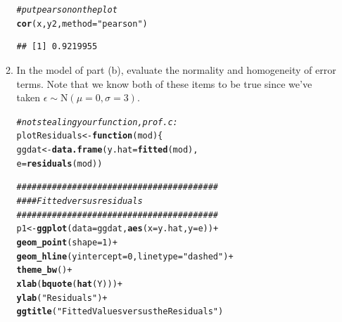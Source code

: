 \documentclass{article}\usepackage[]{graphicx}\usepackage[]{color}
\makeatletter
\newcommand{\hlnum}[1]{\textcolor[rgb]{0.686,0.059,0.569}{#1}}%
\newcommand{\hlstr}[1]{\textcolor[rgb]{0.192,0.494,0.8}{#1}}%
\newcommand{\hlcom}[1]{\textcolor[rgb]{0.678,0.584,0.686}{\textit{#1}}}%
\newcommand{\hlopt}[1]{\textcolor[rgb]{0,0,0}{#1}}%
\newcommand{\hlstd}[1]{\textcolor[rgb]{0.345,0.345,0.345}{#1}}%
\newcommand{\hlkwa}[1]{\textcolor[rgb]{0.161,0.373,0.58}{\textbf{#1}}}%
\newcommand{\hlkwb}[1]{\textcolor[rgb]{0.69,0.353,0.396}{#1}}%
\newcommand{\hlkwc}[1]{\textcolor[rgb]{0.333,0.667,0.333}{#1}}%
\newcommand{\hlkwd}[1]{\textcolor[rgb]{0.737,0.353,0.396}{\textbf{#1}}}%
\newenvironment{kframe}{%
 \def\at@end@of@kframe{}%
 \ifinner\ifhmode%
  \def\at@end@of@kframe{\end{minipage}}%
  \begin{minipage}{\columnwidth}%
 \fi\fi%
 \def\FrameCommand##1{\hskip\@totalleftmargin \hskip-\fboxsep
 \colorbox{shadecolor}{##1}\hskip-\fboxsep
     \hskip-\linewidth \hskip-\@totalleftmargin \hskip\columnwidth}%
 \MakeFramed {\advance\hsize-\width
   \@totalleftmargin\z@ \linewidth\hsize
   \@setminipage}}%
 {\par\unskip\endMakeFramed%
 \at@end@of@kframe}
\newenvironment{knitrout}{}{} %
\makeatother
\begin{document}
\begin{enumerate}
\begin{enumerate}
\begin{knitrout}
\begin{kframe}\begin{alltt}
  \hlcom{#put pearson on the plot}
\hlkwd{cor}\hlstd{(x, y2,} \hlkwc{method}\hlstd{=}\hlstr{"pearson"}\hlstd{)}
\end{alltt}
\begin{verbatim}
## [1] 0.9219955
\end{verbatim}
\end{kframe}
\end{knitrout}
  \item In the model of part (b), evaluate the normality and homogeneity of error terms. Note 
  that we know both of these items to be true since we've taken $\epsilon \sim 
  \textrm{N}(\mu=0,\sigma=3)$.
\begin{knitrout}
\color{fgcolor}\begin{kframe}
\begin{alltt}
\hlcom{#not stealing your function, prof. c:}
\hlstd{plotResiduals}\hlkwb{<-}\hlkwa{function}\hlstd{(}\hlkwc{mod}\hlstd{)\{}
  \hlstd{ggdat} \hlkwb{<-} \hlkwd{data.frame}\hlstd{(}\hlkwc{y.hat} \hlstd{=} \hlkwd{fitted}\hlstd{(mod),}
                      \hlkwc{e} \hlstd{=} \hlkwd{residuals}\hlstd{(mod))}

  \hlcom{########################################}
  \hlcom{####  Fitted versus residuals}
  \hlcom{########################################}
  \hlstd{p1}\hlkwb{<-}\hlkwd{ggplot}\hlstd{(}\hlkwc{data}\hlstd{=ggdat,}\hlkwd{aes}\hlstd{(}\hlkwc{x}\hlstd{=y.hat,}\hlkwc{y}\hlstd{=e))}\hlopt{+}
    \hlkwd{geom_point}\hlstd{(}\hlkwc{shape}\hlstd{=}\hlnum{1}\hlstd{)}\hlopt{+}
    \hlkwd{geom_hline}\hlstd{(}\hlkwc{yintercept}\hlstd{=}\hlnum{0}\hlstd{,}\hlkwc{linetype}\hlstd{=}\hlstr{"dashed"}\hlstd{)}\hlopt{+}
    \hlkwd{theme_bw}\hlstd{()}\hlopt{+}
    \hlkwd{xlab}\hlstd{(}\hlkwd{bquote}\hlstd{(}\hlkwd{hat}\hlstd{(Y)))}\hlopt{+}
    \hlkwd{ylab}\hlstd{(}\hlstr{"Residuals"}\hlstd{)}\hlopt{+}
    \hlkwd{ggtitle}\hlstd{(}\hlstr{"Fitted Values versus the Residuals"}\hlstd{)}


\end{alltt}
\end{kframe}
\end{knitrout}
\end{enumerate}
\end{enumerate}
\end{document}
